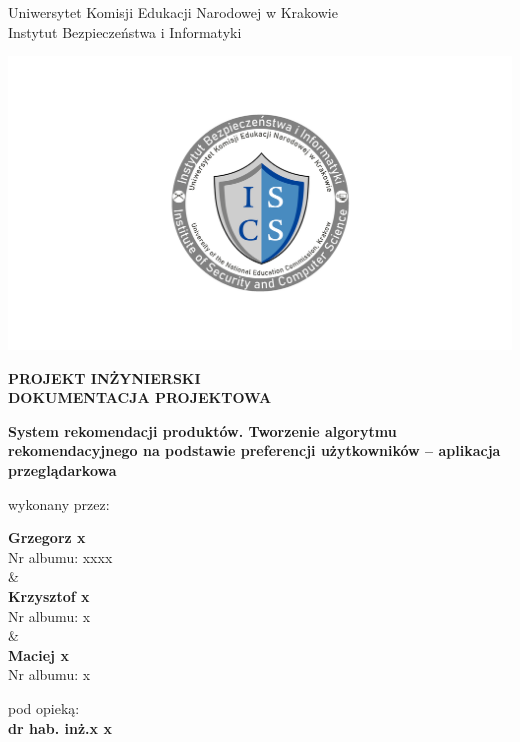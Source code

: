 \documentclass[12pt,a4paper,oneside]{article}
\theoremstyle{definition}
\numberwithin{equation}{section}
\begin{document}
\renewcommand{\thepage}{\arabic{page}}

\thispagestyle{empty} %
\begin{titlepage}
\begin{center}\Large
Uniwersytet Komisji Edukacji Narodowej w Krakowie\\
\large
Instytut Bezpieczeństwa i Informatyki\\
\vskip 10pt
\end{center}
\begin{center}
\centering \includegraphics[width=1.0\columnwidth]{images/logo.png}
\end{center}

\begin{center}
 {\bf \fontsize{14pt}{14pt}\selectfont PROJEKT INŻYNIERSKI \\ DOKUMENTACJA PROJEKTOWA}
\end{center}
\vskip 5pt
\begin{center}
 {\bf \fontsize{15pt}{25pt}\selectfont System rekomendacji produktów. Tworzenie algorytmu rekomendacyjnego na
 podstawie preferencji użytkowników – aplikacja przeglądarkowa}
\end{center}

\begin{center}
 {\fontsize{12pt}{12pt}\selectfont wykonany przez: }
\end{center}
\begin{center}
 {\bf\fontsize{16pt}{16pt}\selectfont Grzegorz x}\\
 {\fontsize{12pt}{12pt}\selectfont Nr albumu:  xxxx \\\&\\}
 {\bf\fontsize{16pt}{16pt}\selectfont Krzysztof x }\\
 {\fontsize{12pt}{12pt}\selectfont Nr albumu: x \\\&\\}
 {\bf\fontsize{16pt}{16pt}\selectfont Maciej x }\\
 {\fontsize{12pt}{12pt}\selectfont Nr albumu: x}
\end{center}
\begin{center}
 {\fontsize{12pt}{12pt}\selectfont pod opieką:}\\
 {\bf\fontsize{12pt}{12pt}\selectfont dr hab. inż.x x  }
\end{center}


\end{titlepage}
\end{document}
